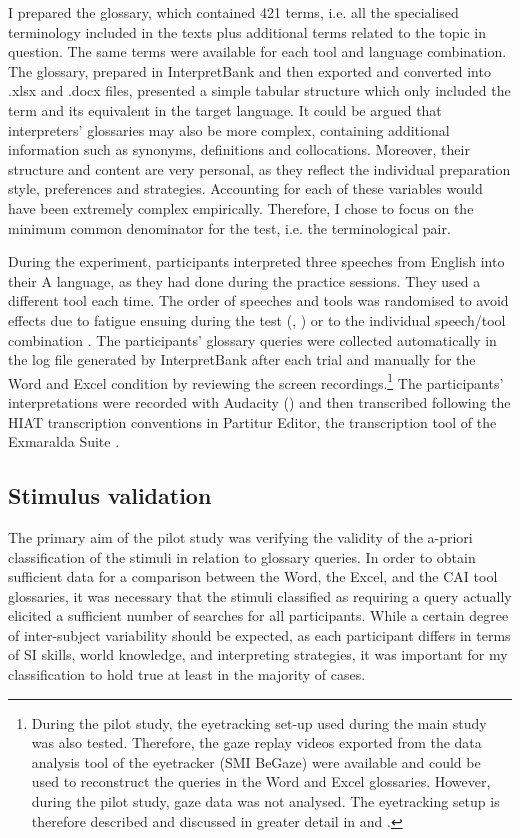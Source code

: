 I prepared the glossary, which contained 421 terms, i.e. all the specialised terminology included in the texts plus additional terms related to the topic in question. The same terms were available for each tool and language combination. The glossary, prepared in InterpretBank and then exported and converted into .xlsx and .docx files, presented a simple tabular structure which only included the term and its equivalent in the target language. It could be argued that interpreters' glossaries may also be more complex, containing additional information such as synonyms, definitions and collocations. Moreover, their structure and content are very personal, as they reflect the individual preparation style, preferences and strategies. Accounting for each of these variables would have been extremely complex empirically. Therefore, I chose to focus on the minimum common denominator for the test, i.e. the terminological pair.


During the experiment, participants interpreted three speeches from English into their A language, as they had done during the practice sessions. They used a different tool each time. The order of speeches and tools was randomised to avoid effects due to fatigue ensuing during the test (\citealt[400]{spinner_ecological_2013}, \citealt[18]{keating_experimental_2015}) or to the individual speech/tool combination \citep[42--43]{conklin_eye-tracking_2018}. The participants' glossary queries were collected automatically in the log file generated by InterpretBank after each trial and manually for the Word and Excel condition by reviewing the screen recordings.\footnote{During the pilot study, the eyetracking set-up used during the main study was also tested. Therefore, the gaze replay videos exported from the data analysis tool of the eyetracker (SMI BeGaze) were available and could be used to reconstruct the queries in the Word and Excel glossaries. However, during the pilot study, gaze data was not analysed. The eyetracking setup is therefore described and discussed in greater detail in  and .} The participants' interpretations were recorded with Audacity (\citeyear{audacity_2021}) and then transcribed following the HIAT transcription conventions \citep{rehbein_handbuch_2004} in Partitur Editor, the transcription tool of the Exmaralda Suite \citep{Schmidtworner2014}.




\subsection{Stimulus validation} \label{stimulus_validation}
The primary aim of the pilot study was verifying the validity of the a-priori classification of the stimuli in relation to glossary queries. In order to obtain sufficient data for a comparison between the Word, the Excel, and the CAI tool glossaries, it was necessary that the stimuli classified as requiring a query actually elicited a sufficient number of searches for all participants. While a certain degree of inter-subject variability should be expected, as each participant differs in terms of SI skills, world knowledge, and interpreting strategies, it was important for my classification to hold true at least in the majority of cases.

